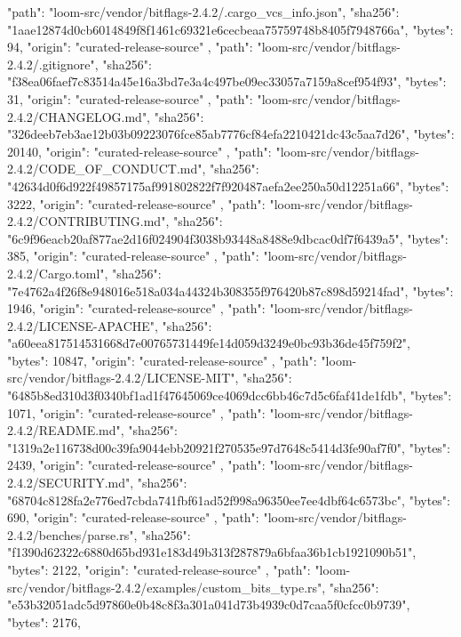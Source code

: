 {{      "path": "loom-src/vendor/bitflags-2.4.2/.cargo_vcs_info.json",
      "sha256": "1aae12874d0cb6014849f8f1461c69321e6cecbeaa75759748b8405f7948766a",
      "bytes": 94,
      "origin": "curated-release-source"
    },
    {
      "path": "loom-src/vendor/bitflags-2.4.2/.gitignore",
      "sha256": "f38ea06faef7c83514a45e16a3bd7e3a4c497be09ec33057a7159a8cef954f93",
      "bytes": 31,
      "origin": "curated-release-source"
    },
    {
      "path": "loom-src/vendor/bitflags-2.4.2/CHANGELOG.md",
      "sha256": "326deeb7eb3ae12b03b09223076fce85ab7776cf84efa2210421dc43c5aa7d26",
      "bytes": 20140,
      "origin": "curated-release-source"
    },
    {
      "path": "loom-src/vendor/bitflags-2.4.2/CODE_OF_CONDUCT.md",
      "sha256": "42634d0f6d922f49857175af991802822f7f920487aefa2ee250a50d12251a66",
      "bytes": 3222,
      "origin": "curated-release-source"
    },
    {
      "path": "loom-src/vendor/bitflags-2.4.2/CONTRIBUTING.md",
      "sha256": "6c9f96eacb20af877ae2d16f024904f3038b93448a8488e9dbcac0df7f6439a5",
      "bytes": 385,
      "origin": "curated-release-source"
    },
    {
      "path": "loom-src/vendor/bitflags-2.4.2/Cargo.toml",
      "sha256": "7e4762a4f26f8e948016e518a034a44324b308355f976420b87c898d59214fad",
      "bytes": 1946,
      "origin": "curated-release-source"
    },
    {
      "path": "loom-src/vendor/bitflags-2.4.2/LICENSE-APACHE",
      "sha256": "a60eea817514531668d7e00765731449fe14d059d3249e0bc93b36de45f759f2",
      "bytes": 10847,
      "origin": "curated-release-source"
    },
    {
      "path": "loom-src/vendor/bitflags-2.4.2/LICENSE-MIT",
      "sha256": "6485b8ed310d3f0340bf1ad1f47645069ce4069dcc6bb46c7d5c6faf41de1fdb",
      "bytes": 1071,
      "origin": "curated-release-source"
    },
    {
      "path": "loom-src/vendor/bitflags-2.4.2/README.md",
      "sha256": "1319a2e116738d00c39fa9044ebb20921f270535e97d7648c5414d3fe90af7f0",
      "bytes": 2439,
      "origin": "curated-release-source"
    },
    {
      "path": "loom-src/vendor/bitflags-2.4.2/SECURITY.md",
      "sha256": "68704c8128fa2e776ed7cbda741fbf61ad52f998a96350ee7ee4dbf64c6573bc",
      "bytes": 690,
      "origin": "curated-release-source"
    },
    {
      "path": "loom-src/vendor/bitflags-2.4.2/benches/parse.rs",
      "sha256": "f1390d62322c6880d65bd931e183d49b313f287879a6bfaa36b1cb1921090b51",
      "bytes": 2122,
      "origin": "curated-release-source"
    },
    {
      "path": "loom-src/vendor/bitflags-2.4.2/examples/custom_bits_type.rs",
      "sha256": "e53b32051adc5d97860e0b48c8f3a301a041d73b4939c0d7caa5f0cfcc0b9739",
      "bytes": 2176,
}}
